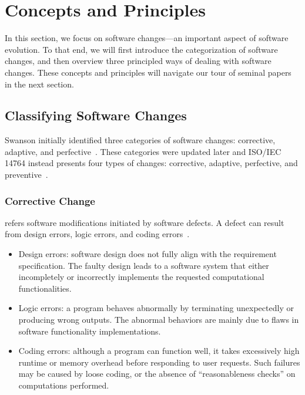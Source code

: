 \documentclass[runningheads,a4paper]{llncs}
\begin{document}

\section{Concepts and Principles}
\label{sec:concepts}

In this section, we focus on software changes---an important aspect of software evolution. To that end, we will first introduce the categorization of software changes, and then overview three principled ways of dealing with software changes. These concepts and principles will navigate our tour of seminal papers in the next section.

\subsection{Classifying Software Changes}
Swanson initially identified three categories of software changes: corrective, adaptive, and perfective~\cite{Swanson1976:Dimension}. These categories were updated later and ISO/IEC 14764 instead presents four types of changes: corrective, adaptive, perfective, and preventive~\cite{iso}.
\subsubsection{Corrective Change} refers software modifications initiated by software defects. A defect can result from design errors, logic errors, and coding errors~\cite{Longstreet1990:smc}.

\begin{itemize}
\item Design errors: software design does not fully align with the requirement specification. The faulty design leads to a software system that either incompletely or incorrectly implements the requested computational functionalities. 
\item Logic errors: a program behaves abnormally by terminating unexpectedly or producing wrong outputs. The abnormal behaviors are mainly due to flaws in software functionality implementations.
\item Coding errors: although a program can function well, it takes excessively high runtime or memory overhead before responding to user requests. Such failures may be caused by loose coding, or the absence of ``reasonableness checks'' on computations performed.
\end{itemize}
\end{document}
